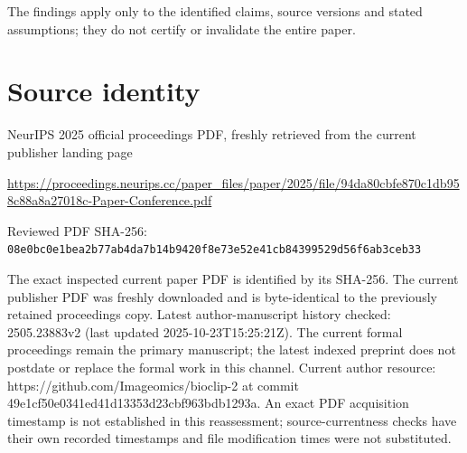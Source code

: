 \documentclass[11pt]{article}
\begin{document}
The findings apply only to the identified claims, source versions and stated assumptions; they do not certify or invalidate the entire paper.\par

\section*{Source identity}

NeurIPS 2025 official proceedings PDF, freshly retrieved from the current publisher landing page

\url{https://proceedings.neurips.cc/paper_files/paper/2025/file/94da80cbfe870c1db958c88a8a27018c-Paper-Conference.pdf}

Reviewed PDF SHA-256: \nolinkurl{08e0bc0e1bea2b77ab4da7b14b9420f8e73e52e41cb84399529d56f6ab3ceb33}

The exact inspected current paper PDF is identified by its SHA-256. The current publisher PDF was freshly downloaded and is byte-identical to the previously retained proceedings copy. Latest author-manuscript history checked: 2505.23883v2 (last updated 2025-10-23T15:25:21Z). The current formal proceedings remain the primary manuscript; the latest indexed preprint does not postdate or replace the formal work in this channel. Current author resource: https://github.com/Imageomics/bioclip-2 at commit 49e1cf50e0341ed41d13353d23cbf963bdb1293a.  An exact PDF acquisition timestamp is not established in this reassessment; source-currentness checks have their own recorded timestamps and file modification times were not substituted.
\end{document}
